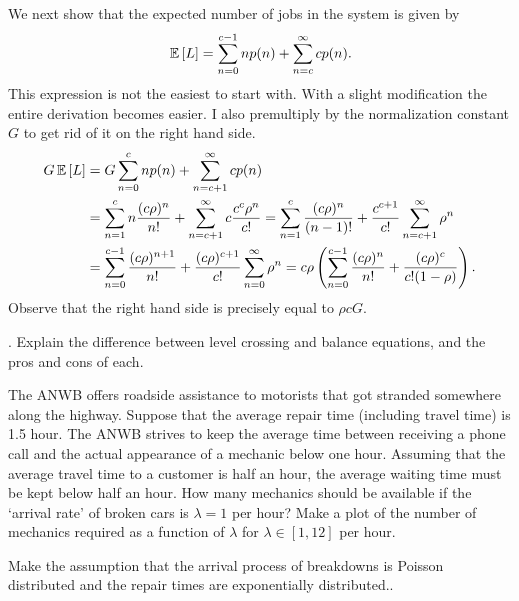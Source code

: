 \begin{question}
\begin{solution}
We next show that the expected number of jobs in the system is given
by
    \begin{equation*}
      \,\mathbb{E}\left[L\right] = \sum_{n=0}^{c-1} n p(n) + \sum_{n=c}^{\infty} c p(n).
    \end{equation*}
    This expression is not the easiest to start with. With a slight
    modification the entire derivation becomes easier. I also premultiply by the normalization constant $G$ to get rid of it on the right hand side. 
    \begin{equation*}
      \begin{split}
      G \,\mathbb{E}\left[L\right]
&= G \sum_{n=0}^{c} n p(n) + \sum_{n=c+1}^{\infty} c p(n) \\
&= \sum_{n=1}^{c} n \frac{(c\rho)^n}{n!}  + \sum_{n=c+1}^{\infty} c \frac{c^c\rho^n}{c!} 
= \sum_{n=1}^{c} \frac{(c\rho)^n}{(n-1)!}  + \frac{c^{c+1}}{c!}\sum_{n=c+1}^{\infty} \rho^n\\
&= \sum_{n=0}^{c-1} \frac{(c\rho)^{n+1}}{n!}  + \frac{(c\rho)^{c+1}}{c!}\sum_{n=0}^{\infty} \rho^n
= c\rho \left(\sum_{n=0}^{c-1} \frac{(c\rho)^n}{n!}  + \frac{(c\rho)^{c}}{c!(1-\rho)}\right).
      \end{split}
    \end{equation*}
Observe that the right hand side is precisely equal to $\rho c G$. 

  \end{solution}
\end{question}



\begin{question}[use=false]
  \TBD.  Explain the difference between level crossing and balance
  equations, and the pros and cons of each.
\end{question}

\begin{question}[use=false]
  The ANWB offers roadside assistance to motorists that got stranded
  somewhere along the highway. Suppose that the average repair time
  (including travel time) is 1.5 hour. The ANWB strives to keep the
  average time between receiving a phone call and the actual
  appearance of a mechanic below one hour. Assuming that the average
  travel time to a customer is half an hour, the average waiting time
  must be kept below half an hour. How many mechanics should be
  available if the `arrival rate' of broken cars is $\lambda = 1$ per
  hour? Make a plot of the number of mechanics required as a function
  of $\lambda$ for $\lambda \in [1, 12]$ per hour. 

  Make the assumption that the arrival process of breakdowns is
  Poisson distributed and the repair times are exponentially distributed..
  \begin{solution}
    \TBD
  \end{solution}
\end{question}


